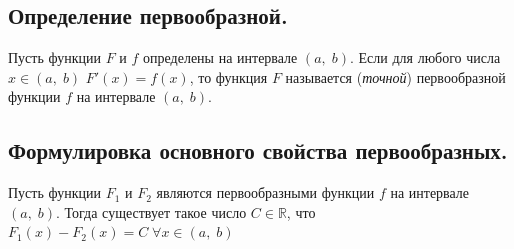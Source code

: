 

\label{sec_Definition20}
\begin{definition}
    \subsection*{Определение первообразной.}
    \begin{note}[purple]
        Пусть функции $F$ и $f$ определены на интервале $(a, \; b)$. Если для любого числа
        $x \in (a, \; b)$ $F'(x) = f(x)$, то функция $F$ называется (\textit{точной})
        первообразной функции $f$ на интервале $(a, \; b)$. 
    \end{note}

    \subsection*{Формулировка основного свойства первообразных.}
    \begin{note}[purple]
        Пусть функции $F_1$ и $F_2$ являются первообразными функции $f$ на интервале $(a, \; b)$.
        Тогда существует такое число $C \in \mathbb{R}$, что $F_1(x) - F_2(x) = C \; 
        \forall x \in (a, \; b)$ 
    \end{note}
\end{definition}